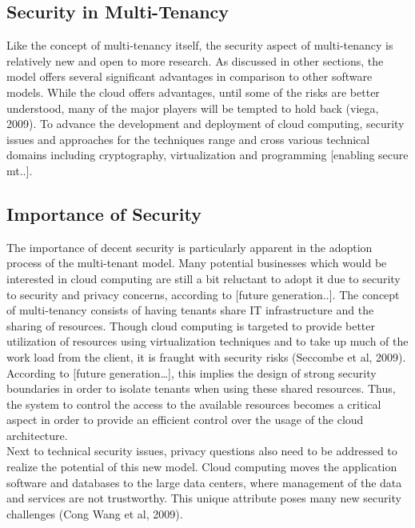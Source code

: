 \subsection{Security in Multi-Tenancy}
Like the concept of multi-tenancy itself, the security aspect of multi-tenancy is relatively new and open to more research. As discussed in other sections, the model offers several significant advantages in comparison to other software models. While the cloud offers advantages, until some of the risks are better understood, many of the major players will be tempted to hold back (viega, 2009). To advance the development and deployment of cloud computing, security issues and approaches for the techniques range and cross various technical domains including cryptography, virtualization and programming [enabling secure mt..].\\

\subsection{Importance of Security}
The importance of decent security is particularly apparent in the adoption process of the multi-tenant model. Many potential businesses which would be interested in cloud computing are still a bit reluctant to adopt it due to security to security and privacy concerns, according to [future generation..]. The concept of multi-tenancy consists of having tenants share IT infrastructure and the sharing of resources. Though cloud computing is targeted to provide better utilization of resources using virtualization techniques and to take up much of the work load from the client, it is fraught with security risks (Seccombe et al, 2009). According to [future generation…], this implies the design of strong security boundaries in order to isolate tenants when using these shared resources. Thus, the system to control the access to the available resources becomes a critical aspect in order to provide an efficient control over the usage of the cloud architecture. \\
Next to technical security issues, privacy questions also need to be addressed to realize the potential of this new model. Cloud computing moves the application software and databases to the large data centers, where management of the data and services are not trustworthy. This unique attribute poses many new security challenges (Cong Wang et al, 2009). \\

